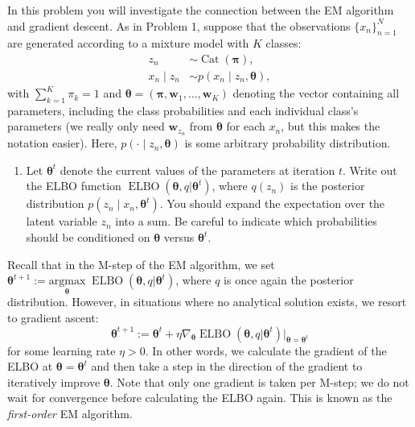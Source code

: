 \documentclass[submit]{harvardml}
\begin{document}
\begin{problem}
  
In this problem you will investigate the connection between the EM algorithm and gradient descent. As in Problem 1, suppose that the observations $\{x_n\}_{n = 1}^N$ are generated according to a mixture model with $K$ classes:
\begin{align*}
    z_n &\sim \operatorname{Cat}(\bm \pi), \\
    x_n \mid z_n &\sim p(x_n \mid z_n, \bm \theta),
\end{align*}
with $\sum_{k = 1}^K\pi_k = 1$ and $\bm \theta = (\bm \pi, \mathbf {w}_1, \dots, \mathbf{w}_K)$ denoting the vector containing all parameters, including the class probabilities and each individual class's parameters (we really only need $\mathbf{w}_{z_n}$ from $\bm \theta$ for each $x_n$, but this makes the notation easier).  Here, $p(\cdot \mid z_n, \bm \theta)$ is some arbitrary probability distribution.

\begin{enumerate}

\item Let $\bm \theta^t$ denote the current values of the parameters at iteration $t$. Write out the ELBO function $\operatorname{ELBO}(\bm \theta, q | \bm \theta^t)$, where $q(z_n)$ is the posterior distribution $p(z_n\mid x_n, \bm \theta^t)$. You should expand the expectation over the latent variable $z_n$ into a sum. Be careful to indicate which probabilities should be conditioned on $\bm \theta$ versus $\bm \theta^t$.
\end{enumerate}

Recall that in the M-step of the EM algorithm, we set $\bm \theta^{t+1} := \underset{\bm\theta}{\text{argmax}}\; \operatorname{ELBO}(\bm \theta, q | \bm \theta^t)$, where $q$ is once again the posterior distribution. However, in situations where no analytical solution exists, we resort to gradient ascent:
$$
\bm \theta^{t+1} := \bm\theta^t + \eta \nabla_{\bm\theta} \operatorname{ELBO}(\bm \theta, q | \bm \theta^t) \big|_{\bm \theta = \bm \theta^t}
$$
for some learning rate $\eta > 0$. In other words, we calculate the gradient of the ELBO at $\bm \theta = \bm \theta^t$ and then take a step in the direction of the gradient to iteratively improve $\bm \theta$. Note that only one gradient is taken per M-step; we do not wait for convergence before calculating the ELBO again. This is known as the \textit{first-order} EM algorithm.


\end{problem}
\end{document}
